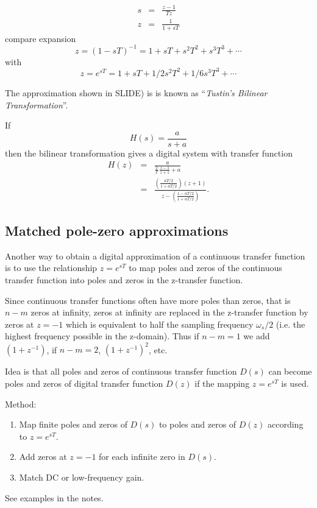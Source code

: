 \begin{slide}\label{slide:l11s21}
  
  \begin{eqnarray*}
     s &=& \frac{z-1}{Tz} \\
     z &=& \frac{1}{1 + sT}
  \end{eqnarray*}
  compare expansion $$z=(1-sT)^{-1} = 1 + sT + s^2T^2 + s^3T^3
 + \cdots$$  with $$z = e^{sT} = 1 + sT + 1/2 s^2T^2 + 1/6 s^3T^3 + \cdots$$
\end{slide}


The approximation shown in SLIDE) is
is known as ``\emph{Tustin's Bilinear Transformation}''.

\begin{slide}\label{slide:l11s23}
  If \[H(s) = \frac{a}{s+a}\] then the bilinear transformation gives a
  digital system with transfer function
  \begin{eqnarray*}
    H(z)&=& \frac{a}{\frac{2}{T}\,\frac{z-1}{z+1}+a} \\
        &=& \frac{\left(\frac{aT/2}{1+aT/2}\right)(z+1)}{z-\left(\frac{1-aT/2}{1+aT/2}\right)}.
  \end{eqnarray*}
\end{slide}

\subsection*{Matched pole-zero approximations}

Another way to obtain a digital approximation of a continuous transfer function is to use the relationship $z = e^{sT}$ to map poles and zeros of the continuous transfer function into poles and zeros in the z-transfer function. 

Since continuous transfer functions often have more poles than zeros, that is $n-m$ zeros at infinity, zeros at infinity are replaced in the z-transfer function by zeros at $z = -1$ which is equivalent to half the sampling frequency $\omega_s/2$ (i.e. the highest frequency possible in the z-domain). Thus if $n-m =1$ we add $(1+z^{-1})$, if $n-m=2$, $(1+z^{-1})^2$, etc. 

\begin{slide}\label{slides:l11s24}
	Idea is that all poles and zeros of continuous transfer function $D(s)$ can become poles and zeros of digital transfer function $D(z)$ if the mapping $z=e^{sT}$ is used.
	
	Method:
	\begin{enumerate}
		\item Map finite poles and zeros of $D(s)$ to poles and zeros of $D(z)$ according to $z=e^{sT}$.
		\item Add zeros at $z=-1$ for each infinite zero in $D(s)$.
		\item Match DC or low-frequency gain.
	\end{enumerate}
	See examples in the notes.
\end{slide}


